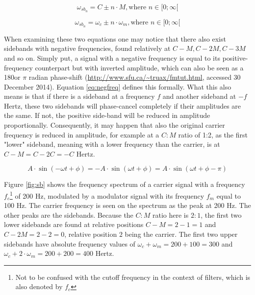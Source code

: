  \begin{equation}
    \omega_{{sb}_{n}} = C \pm n \cdot M, \text{where } n \in [0;\infty[
    \label{eq:sbcm}
  \end{equation}

  \begin{equation}
    \omega_{{sb}_{n}} = \omega_{c} \pm n \cdot \omega_{m}, \text{where } n \in [0;\infty[
    \label{eq:sbabs}
  \end{equation}

  \noindent When examining these two equations one may notice that there also exist sidebands with negative frequencies, found relatively at $C - M, C - 2M, C - 3M$ and so on. Simply put, a signal with a negative frequency is equal to its positive-frequency counterpart but with inverted amplitude, which can also be seen as a 180\degree or $\pi$ radian phase-shift (\url{http://www.sfu.ca/~truax/fmtut.html}, accessed 30 December 2014). Equation \ref{eq:negfreq} defines this formally. What this also means is that if there is a sideband at a frequency $f$ and another sideband at $-f$ Hertz, these two sidebands will phase-cancel completely if their amplitudes are the same. If not, the positive side-band will be reduced in amplitude proportionally. Consequently, it may happen that also the original carrier frequency is reduced in amplitude, for example at a $C:M$ ratio of 1:2, as the first "lower" sideband, meaning with a lower frequency than the carrier, is at $C - M = C - 2C = -C$ Hertz.

  \begin{equation}
    A \cdot \sin(-\omega t + \phi) = -A \cdot \sin(\omega t + \phi) = A \cdot \sin(\omega t + \phi - \pi)
    \label{eq:negfreq}
  \end{equation}

  \noindent Figure \ref{fig:sb} shows the frequency spectrum of a carrier signal with a frequency $f_{c}$\footnote{Not to be confused with the cutoff frequency in the context of filters, which is also denoted by $f_{c}$} of 200 Hz, modulated by a modulator signal with its frequency $f_{m}$ equal to 100 Hz. The carrier frequency is seen on the spectrum as the peak at 200 Hz. The other peaks are the sidebands. Because the $C:M$ ratio here is $2:1$, the first two lower sidebands are found at relative positions $C-M=2-1=1$ and $C-2M=2-2=0$, relative position $2$ being the carrier. The first two upper sidebands have absolute frequency values of $\omega_{c} + \omega_{m} = 200 + 100 = 300$ and %
  $\omega_{c} +2\cdot\omega_{m} = 200 + 200 = 400$ Hertz.\\

